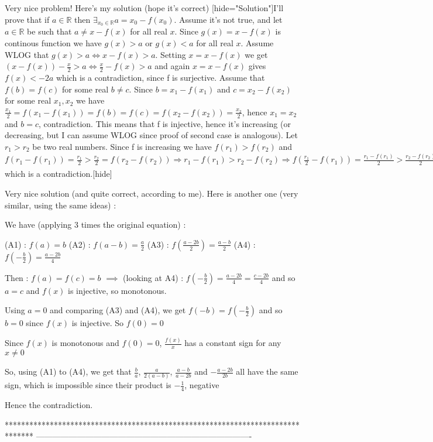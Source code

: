 \begin{solution}
	\begin{tcolorbox}Very nice problem! Here's my solution (hope it's correct)
[hide="Solution"]I'll prove that if $ a\in \mathbb{R}$ then $ \exists_{x_0\in \mathbb{R}} a = x_0 - f(x_0)$. Assume it's not true, and let $ a\in \mathbb{R}$ be such that $ a\neq x - f(x)$ for all real $ x$. Since $ g(x) = x - f(x)$ is continous function we have $ g(x) > a$ or $ g(x) < a$ for all real $ x$. Assume WLOG that $ g(x) > a\iff x - f(x) > a$. Setting $ x = x - f(x)$ we get $ (x - f(x)) - \frac {x}{2} > a\iff \frac {x}{2} - f(x) > a$ and again $ x = x - f(x)$ gives $ f(x) < - 2a$ which is a contradiction, since f is surjective. Assume that $ f(b) = f(c)$ for some real $ b\neq c$. Since $ b = x_1 - f(x_1)$ and $ c = x_2 - f(x_2)$ for some real $ x_1,x_2$ we have $ \frac {x_1}{2} = f(x_1 - f(x_1)) = f(b) = f(c) = f(x_2 - f(x_2)) = \frac {x_2}{2}$, hence $ x_1 = x_2$ and $ b = c$, contradiction. This means that f is injective, hence it's increasing (or decreasing, but I can assume WLOG since proof of second case is analogous). Let $ r_1 > r_2$ be two real numbers. Since f is increasing we have $ f(r_1) > f(r_2)$ and $ f(r_1 - f(r_1)) = \frac {r_1}{2} > \frac {r_2}{2} = f(r_2 - f(r_2))\Rightarrow r_1 - f(r_1) > r_2 - f(r_2)\Rightarrow f(\frac {r_1}{2} - f(r_1)) = \frac {r_1 - f(r_1)}{2} > \frac {r_2 - f(r_2)}{2} = f(\frac {r_2}{2} - f(r_2))\Rightarrow f( - \frac {f(r_1)}{2}) = \frac {\frac {r_1}{2} - f(r_1)}{2} > \frac {\frac {r_2}{2} - f(r_2)}{2} = f( - \frac {f(r_2)}{2})\Rightarrow f(r_1) < f(r_2)$ which is a contradiction.[\/hide]\end{tcolorbox}

Very nice solution (and quite correct, according to me). Here is another one (very similar, using the same ideas) :

We have (applying 3 times the original equation) :

(A1) : $ f(a) = b$
(A2) : $ f(a - b) = \frac {a}{2}$
(A3) : $ f(\frac {a - 2b}{2}) = \frac {a - b}{2}$
(A4) : $ f( - \frac {b}{2}) = \frac {a - 2b}{4}$

Then : $ f(a) = f(c) = b$ $ \implies$ (looking at A4) : $ f( - \frac {b}{2}) = \frac {a - 2b}{4} = \frac {c - 2b}{4}$ and so $ a = c$ and $ f(x)$ is injective, so monotonous.

Using $ a = 0$ and comparing (A3) and (A4), we get $ f( - b) = f( - \frac {b}{2})$ and so $ b = 0$ since $ f(x)$ is injective. So $ f(0) = 0$

Since $ f(x)$ is monotonous and $ f(0) = 0$, $ \frac {f(x)}{x}$ has a constant sign for any $ x\neq 0$

So, using (A1) to (A4), we get that $ \frac {b}{a}$, $ \frac {a}{2(a - b)}$, $ \frac {a - b}{a - 2b}$ and $ - \frac {a - 2b}{2b}$ all have the same sign, which is impossible since their product is $ - \frac {1}{4}$, negative

Hence the contradiction.
\end{solution}
*******************************************************************************
-------------------------------------------------------------------------------

